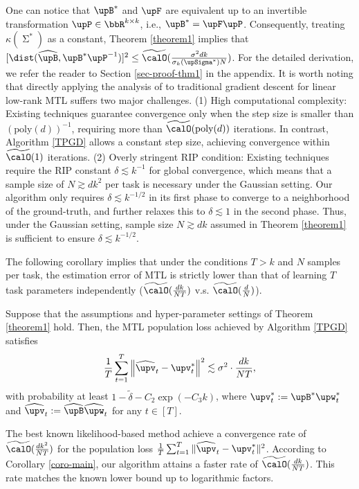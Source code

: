 One can notice that $\upB^*$ and $\upF$ are equivalent up to an invertible transformation $\upP \in\bbR^{k \times k}$, i.e., $\upB^*=\upF\upP$. Consequently, treating $\kappa(\upSigma^*)$ as a constant, Theorem \ref{theorem1} implies that $[\dist(\widehat{\upB}, \upB^*\upP^{-1})]^2\leq\widetilde{\calO}(\frac{\sigma^2 dk}{\sigma_k(\upSigma^*)N})$. For the detailed derivation, we refer the reader to Section \ref{sec-proof-thm1} in the appendix. It is worth noting that directly applying the analysis of \citet{xiong2023overparameterizationslowsgradientdescent} to traditional gradient descent for linear low-rank MTL suffers two major challenges. (1) High computational complexity: Existing techniques guarantee convergence only when the step size is smaller than $(\text{poly}(d))^{-1}$, requiring more than $\widetilde{\calO}(\text{poly}(d))$ iterations. In contrast, Algorithm \ref{TPGD} allows a constant step size, achieving convergence within $\widetilde{\calO}(1)$ iterations. (2) Overly stringent RIP condition: Existing techniques require the RIP constant $\delta \lesssim k^{-1}$ for global convergence, which means that a sample size of $N \gtrsim d k^2$ per task is necessary under the Gaussian setting. Our algorithm only requires $\delta \lesssim k^{-1/2}$ in its first phase to converge to a neighborhood of the ground-truth, and further relaxes this to $\delta \lesssim 1$ in the second phase. Thus, under the Gaussian setting, sample size $N \gtrsim dk$ assumed in Theorem \ref{theorem1} is sufficient to ensure $\delta\lesssim k^{-1/2}$.

The following corollary implies that under the conditions $T > k$ and $N$ samples per task, the estimation error  of MTL  is strictly lower than that of learning $T$ task parameters independently ($\widetilde{\calO}(\frac{dk}{NT})$ v.s. $\widetilde{\calO}(\frac{d}{N})$).
\begin{corollary}\label{coro-main}
    Suppose that the assumptions and hyper-parameter settings of Theorem \ref{theorem1} hold.
    Then, the MTL population loss achieved by Algorithm \ref{TPGD} satisfies
    \begin{align*}
        \frac{1}{T}\sum_{t=1}^T\left\|\widehat{\upv}_t-\upv_t^*\right\|^2\lesssim\sigma^2\cdot\frac{dk}{NT},
    \end{align*}
    with probability at least $1-\widetilde{\delta}-C_2\exp(-C_3k)$, where $\upv_t^*:=\upB^*\upw_t^*$ and  $\widehat{\upv}_t:=\widehat{\upB}\widehat{\upw}_t$ for any $t\in[T]$.
\end{corollary}
The best known likelihood-based method \citep{tripuraneni2021provable,du2021few,thekumparampil2021statistically,duan2023adaptive,tian2025learning} achieve a convergence rate of $\widetilde{\calO}(\frac{d k^2}{N T})$ for the population loss $\frac{1}{T}\sum_{t=1}^T\|\widehat{\upv}_t-\upv_t^*\|^2$. According to Corollary \ref{coro-main}, our algorithm attains a faster rate of $\widetilde{\calO}(\frac{dk}{NT})$. This rate matches the known lower bound \citep{tripuraneni2021provable,tian2025learning} up to logarithmic factors.

